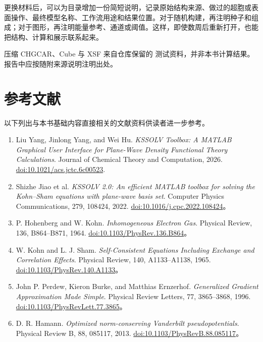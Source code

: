 更换材料后，可以为目录增加一份简短说明，记录原始结构来源、做过的超胞或表面操作、最终模型名称、工作流用途和结果位置。对于随机构建，再注明种子和组成；对于图形，再注明能量参考、通道或阈值。这样，即使数周后重新打开，也能把结构、计算和展示联系起来。

压缩 CHGCAR、Cube 与 XSF 来自仓库保留的  测试资料，并非本书计算结果。报告中应按随附来源说明注明出处。

\section{参考文献}

以下列出与本书基础内容直接相关的文献资料供读者进一步参考。

\begingroup
\small
\RaggedRight
\begin{enumerate}[itemsep=4pt]
\item Liu Yang, Jinlong Yang, and Wei Hu. \textit{KSSOLV Toolbox: A MATLAB\regmark{} Graphical User Interface for Plane-Wave Density Functional Theory Calculations}. Journal of Chemical Theory and Computation, 2026. \href{https://doi.org/10.1021/acs.jctc.6c00523}{doi:10.1021/acs.jctc.6c00523}.
\item Shizhe Jiao et al. \textit{KSSOLV 2.0: An efficient MATLAB\regmark{} toolbox for solving the Kohn--Sham equations with plane-wave basis set}. Computer Physics Communications, 279, 108424, 2022. \href{https://doi.org/10.1016/j.cpc.2022.108424}{doi:10.1016/j.cpc.2022.108424}。
\item P. Hohenberg and W. Kohn. \textit{Inhomogeneous Electron Gas}. Physical Review, 136, B864--B871, 1964. \href{https://doi.org/10.1103/PhysRev.136.B864}{doi:10.1103/PhysRev.136.B864}。
\item W. Kohn and L. J. Sham. \textit{Self-Consistent Equations Including Exchange and Correlation Effects}. Physical Review, 140, A1133--A1138, 1965. \href{https://doi.org/10.1103/PhysRev.140.A1133}{doi:10.1103/PhysRev.140.A1133}。
\item John P. Perdew, Kieron Burke, and Matthias Ernzerhof. \textit{Generalized Gradient Approximation Made Simple}. Physical Review Letters, 77, 3865--3868, 1996. \href{https://doi.org/10.1103/PhysRevLett.77.3865}{doi:10.1103/PhysRevLett.77.3865}。
\item D. R. Hamann. \textit{Optimized norm-conserving Vanderbilt pseudopotentials}. Physical Review B, 88, 085117, 2013. \href{https://doi.org/10.1103/PhysRevB.88.085117}{doi:10.1103/PhysRevB.88.085117}。
\end{enumerate}

\endgroup
